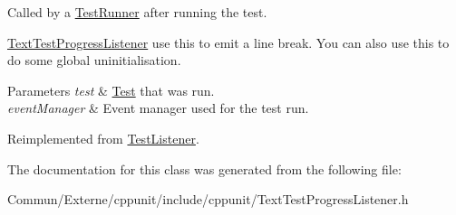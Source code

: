 Called by a \hyperlink{class_test_runner}{Test\+Runner} after running the test. 

\hyperlink{class_text_test_progress_listener}{Text\+Test\+Progress\+Listener} use this to emit a line break. You can also use this to do some global uninitialisation.


\begin{DoxyParams}{Parameters}
{\em test} & \hyperlink{class_test}{Test} that was run. \\
\hline
{\em event\+Manager} & Event manager used for the test run. \\
\hline
\end{DoxyParams}


Reimplemented from \hyperlink{class_test_listener_a0411708032f688f6ec234bcc5e089289}{Test\+Listener}.



The documentation for this class was generated from the following file\+:\begin{DoxyCompactItemize}
\item 
Commun/\+Externe/cppunit/include/cppunit/Text\+Test\+Progress\+Listener.\+h\end{DoxyCompactItemize}
